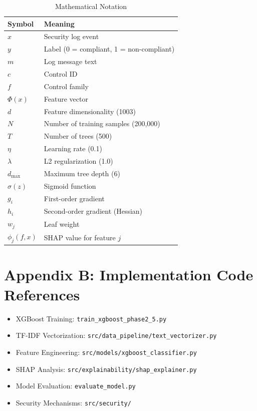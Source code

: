 \documentclass[12pt,a4paper]{article}
\begin{document}
\begin{table}[h]
\centering
\begin{tabular}{ll}
\toprule
\textbf{Symbol} & \textbf{Meaning} \\
\midrule
$x$ & Security log event \\
$y$ & Label (0 = compliant, 1 = non-compliant) \\
$m$ & Log message text \\
$c$ & Control ID \\
$f$ & Control family \\
$\Phi(x)$ & Feature vector \\
$d$ & Feature dimensionality (1003) \\
$N$ & Number of training samples (200,000) \\
$T$ & Number of trees (500) \\
$\eta$ & Learning rate (0.1) \\
$\lambda$ & L2 regularization (1.0) \\
$d_{\text{max}}$ & Maximum tree depth (6) \\
$\sigma(z)$ & Sigmoid function \\
$g_i$ & First-order gradient \\
$h_i$ & Second-order gradient (Hessian) \\
$w_j$ & Leaf weight \\
$\phi_j(f, x)$ & SHAP value for feature $j$ \\
\bottomrule
\end{tabular}
\caption{Mathematical Notation}
\end{table}

\section*{Appendix B: Implementation Code References}

\begin{itemize}
    \item XGBoost Training: \texttt{train\_xgboost\_phase2\_5.py}
    \item TF-IDF Vectorization: \texttt{src/data\_pipeline/text\_vectorizer.py}
    \item Feature Engineering: \texttt{src/models/xgboost\_classifier.py}
    \item SHAP Analysis: \texttt{src/explainability/shap\_explainer.py}
    \item Model Evaluation: \texttt{evaluate\_model.py}
    \item Security Mechanisms: \texttt{src/security/}
\end{itemize}
\end{document}
